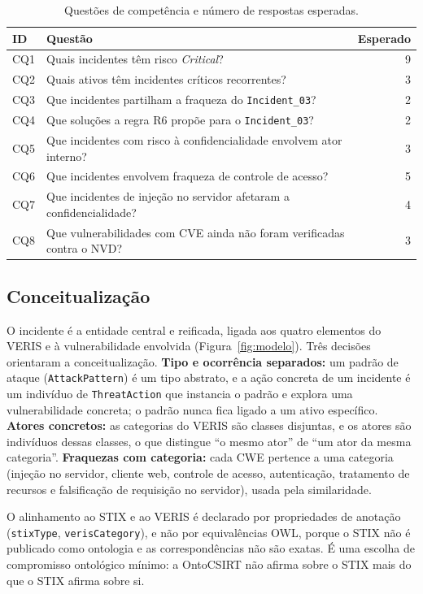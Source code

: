 \documentclass[12pt]{article}
\newcommand{\oc}[1]{\texttt{#1}}
\begin{document}
\begin{table}[ht]
\centering\small
\caption{Questões de competência e número de respostas esperadas.}
\label{tab:cq}
\begin{tabularx}{\textwidth}{@{}lXr@{}}
\toprule
ID & Questão & Esperado\\
\midrule
CQ1 & Quais incidentes têm risco \emph{Critical}? & 9\\
CQ2 & Quais ativos têm incidentes críticos recorrentes? & 3\\
CQ3 & Que incidentes partilham a fraqueza do \oc{Incident\_03}? & 2\\
CQ4 & Que soluções a regra R6 propõe para o \oc{Incident\_03}? & 2\\
CQ5 & Que incidentes com risco à confidencialidade envolvem ator interno? & 3\\
CQ6 & Que incidentes envolvem fraqueza de controle de acesso? & 5\\
CQ7 & Que incidentes de injeção no servidor afetaram a confidencialidade? & 4\\
CQ8 & Que vulnerabilidades com CVE ainda não foram verificadas contra o NVD? & 3\\
\bottomrule
\end{tabularx}
\end{table}

\subsection{Conceitualização}

O incidente é a entidade central e reificada, ligada aos quatro elementos do VERIS e à vulnerabilidade envolvida (Figura~\ref{fig:modelo}). Três decisões orientaram a conceitualização. \textbf{Tipo e ocorrência separados:} um padrão de ataque (\oc{AttackPattern}) é um tipo abstrato, e a ação concreta de um incidente é um indivíduo de \oc{ThreatAction} que instancia o padrão e explora uma vulnerabilidade concreta; o padrão nunca fica ligado a um ativo específico. \textbf{Atores concretos:} as categorias do VERIS são classes disjuntas, e os atores são indivíduos dessas classes, o que distingue ``o mesmo ator'' de ``um ator da mesma categoria''. \textbf{Fraquezas com categoria:} cada CWE pertence a uma categoria (injeção no servidor, cliente web, controle de acesso, autenticação, tratamento de recursos e falsificação de requisição no servidor), usada pela similaridade.

O alinhamento ao STIX e ao VERIS é declarado por propriedades de anotação (\oc{stixType}, \oc{verisCategory}), e não por equivalências OWL, porque o STIX não é publicado como ontologia e as correspondências não são exatas. É uma escolha de compromisso ontológico mínimo: a OntoCSIRT não afirma sobre o STIX mais do que o STIX afirma sobre si.
\end{document}
